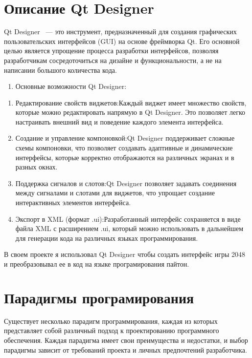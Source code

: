 \section{\label{subsec:ch01/sec01/sub01}Описание Qt Designer}
Qt Designer~\cite{QtDesigner} — это инструмент, предназначенный для создания графических пользовательских интерфейсов (GUI) на основе фреймворка Qt. Его основной целью является упрощение процесса разработки интерфейсов, позволяя разработчикам сосредоточиться на дизайне и функциональности, а не на написании большого количества кода.
\begin{enumerate}
\item Основные возможности Qt Designer:
\end{enumerate}
\begin{enumerate}
\item  Редактирование свойств виджетов:Каждый виджет имеет множество свойств, которые можно редактировать напрямую в Qt Designer. Это позволяет легко настраивать внешний вид и поведение каждого элемента интерфейса.

\item  Создание и управление компоновкой:Qt Designer поддерживает сложные схемы компоновки, что позволяет создавать адаптивные и динамические интерфейсы, которые корректно отображаются на различных экранах и в разных окнах.

\item  Поддержка сигналов и слотов:Qt Designer позволяет задавать соединения между сигналами и слотами для виджетов, что упрощает создание интерактивных элементов интерфейса.

\item Экспорт в XML (формат .ui):Разработанный интерфейс сохраняется в виде файла XML с расширением .ui, который можно использовать в дальнейшем для генерации кода на различных языках программирования.
\end{enumerate}
В своем проекте я использовал Qt Designer чтобы создать интерфейс игры 2048 и преобразовывал ее в код на языке програмирования пайтон.
\section{\label{subsec:ch01/sec01/sub01}Парадигмы програмирования }
 Существует несколько парадигм программирования, каждая из которых представляет собой различный подход к проектированию программного обеспечения. Каждая парадигма имеет свои преимущества и недостатки, и выбор парадигмы зависит от требований проекта и личных предпочтений разработчика.

